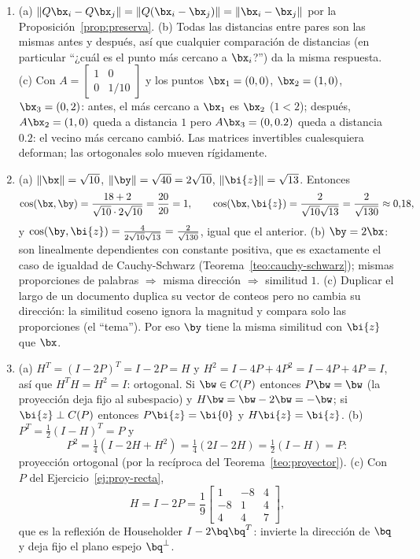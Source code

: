 \begin{enumerate}[leftmargin=*,label=\textbf{\thechapter.\arabic*}]
\item (a) $\|Q\bx_i-Q\bx_j\|=\|Q(\bx_i-\bx_j)\|=\|\bx_i-\bx_j\|$ por la
Proposición~\ref{prop:preserva}. (b) Todas las distancias entre pares son
las mismas antes y después, así que cualquier comparación de distancias (en
particular ``¿cuál es el punto más cercano a $\bx_i$?'') da la misma
respuesta. (c) Con $A=\begin{bmatrix}1&0\\0&1/10\end{bmatrix}$ y los puntos
$\bx_1=(0,0)$, $\bx_2=(1,0)$, $\bx_3=(0,2)$: antes, el más cercano a
$\bx_1$ es $\bx_2$ ($1<2$); después, $A\bx_2=(1,0)$ queda a distancia $1$
pero $A\bx_3=(0,0.2)$ queda a distancia $0.2$: el vecino más cercano cambió.
Las matrices invertibles cualesquiera deforman; las ortogonales solo mueven
rígidamente.

\item (a) $\|\bx\|=\sqrt{10}$, $\|\by\|=\sqrt{40}=2\sqrt{10}$,
$\|\bi{z}\|=\sqrt{13}$. Entonces
\[
\cos(\bx,\by)=\frac{18+2}{\sqrt{10}\cdot2\sqrt{10}}=\frac{20}{20}=1,
\qquad
\cos(\bx,\bi{z})=\frac{2}{\sqrt{10}\sqrt{13}}=\frac{2}{\sqrt{130}}
\approx 0{,}18,
\]
y $\cos(\by,\bi{z})=\frac{4}{2\sqrt{10}\sqrt{13}}=\frac{2}{\sqrt{130}}$,
igual que el anterior. (b) $\by=2\bx$: son linealmente dependientes con
constante positiva, que es exactamente el caso de igualdad de
Cauchy-Schwarz (Teorema~\ref{teo:cauchy-schwarz}); mismas proporciones de
palabras $\Rightarrow$ misma dirección $\Rightarrow$ similitud $1$.
(c) Duplicar el largo de un documento duplica su vector de conteos pero no
cambia su dirección: la similitud coseno ignora la magnitud y compara solo
las proporciones (el ``tema''). Por eso $\by$ tiene la misma similitud con
$\bi{z}$ que $\bx$.

\item (a) $H^T=(I-2P)^T=I-2P=H$ y
$H^2=I-4P+4P^2=I-4P+4P=I$, así que $H^T H=H^2=I$: ortogonal. Si
$\bw\in C(P)$ entonces $P\bw=\bw$ (la proyección deja fijo al subespacio)
y $H\bw=\bw-2\bw=-\bw$; si $\bi{z}\perp C(P)$ entonces $P\bi{z}=\bi{0}$ y
$H\bi{z}=\bi{z}$. (b) $P^T=\frac12(I-H)^T=P$ y
\[
P^2=\tfrac14(I-2H+H^2)=\tfrac14(2I-2H)=\tfrac12(I-H)=P :
\]
proyección ortogonal (por la recíproca del
Teorema~\ref{teo:proyector}). (c) Con $P$ del Ejercicio~\ref{ej:proy-recta},
\[
H=I-2P=\frac19\begin{bmatrix}1&-8&4\\-8&1&4\\4&4&7\end{bmatrix},
\]
que es la reflexión de Householder $I-2\bq\bq^T$: invierte la
dirección de $\bq$ y deja fijo el plano espejo $\bq^{\perp}$.

\end{enumerate}

 
